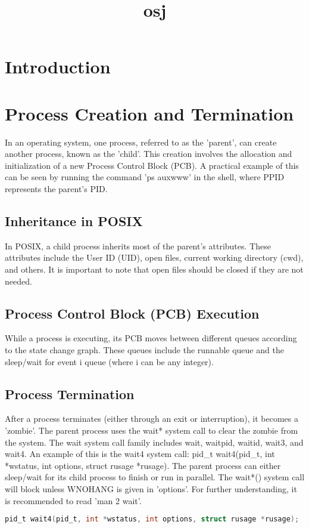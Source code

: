 \documentclass[12pt]{report}
\title{osj}
\author{}
\begin{document}
\maketitle
\tableofcontents
\newpage

\section{Introduction}
  \section{Process Creation and Termination}  In an operating system, one process, referred to as the 'parent', can create another process, known as the 'child'. This creation involves the allocation and initialization of a new Process Control Block (PCB). A practical example of this can be seen by running the command 'ps auxwww' in the shell, where PPID represents the parent's PID.    \subsection{Inheritance in POSIX}  In POSIX, a child process inherits most of the parent's attributes. These attributes include the User ID (UID), open files, current working directory (cwd), and others. It is important to note that open files should be closed if they are not needed.     \subsection{Process Control Block (PCB) Execution}  While a process is executing, its PCB moves between different queues according to the state change graph. These queues include the runnable queue and the sleep/wait for event i queue (where i can be any integer).    \subsection{Process Termination}  After a process terminates (either through an exit or interruption), it becomes a 'zombie'. The parent process uses the wait* system call to clear the zombie from the system. The wait system call family includes wait, waitpid, waitid, wait3, and wait4. An example of this is the wait4 system call: pid_t wait4(pid_t, int *wstatus, int options, struct rusage *rusage).     The parent process can either sleep/wait for its child process to finish or run in parallel. The wait*() system call will block unless WNOHANG is given in 'options'. For further understanding, it is recommended to read 'man 2 wait'.  
  \begin{lstlisting}[language=C]  pid_t wait4(pid_t, int *wstatus, int options, struct rusage *rusage);  \end{lstlisting}  
\end{document}

